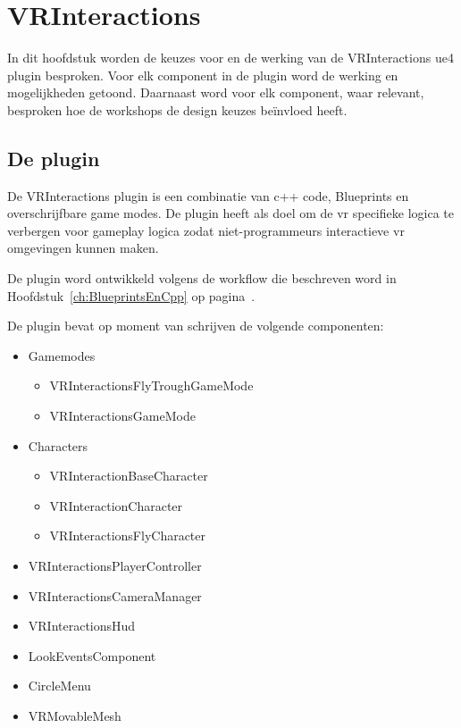 \lstset {language=C++}

\chapter{VRInteractions}
\label{ch:vrinteractions}
In dit hoofdstuk worden de keuzes voor en de werking van de VRInteractions \gls{ue4} plugin besproken. 
Voor elk component in de plugin word de werking en mogelijkheden getoond. Daarnaast word voor elk component, waar relevant, besproken hoe de workshops de design keuzes beïnvloed heeft.

\section{De plugin}
De VRInteractions plugin is een combinatie van c++ code, Blueprints en overschrijfbare game modes.
De plugin heeft als doel om de \gls{vr} specifieke logica te verbergen voor gameplay logica zodat niet-programmeurs interactieve \gls{vr} omgevingen kunnen maken.

De plugin word ontwikkeld volgens de workflow die beschreven word in Hoofdstuk~\ref{ch:BlueprintsEnCpp} op pagina~\pageref{ch:BlueprintsEnCpp}.

De plugin bevat op moment van schrijven de volgende componenten:
\begin{itemize}
	\item Gamemodes
		\begin{itemize}
			\item VRInteractionsFlyTroughGameMode
			\item VRInteractionsGameMode
		\end{itemize}
	\item Characters
		\begin{itemize}
			\item VRInteractionBaseCharacter
			\item VRInteractionCharacter
			\item VRInteractionsFlyCharacter
		\end{itemize}
	\item VRInteractionsPlayerController
	\item VRInteractionsCameraManager
	\item VRInteractionsHud
	\item LookEventsComponent
	\item CircleMenu
	\item VRMovableMesh
\end{itemize}

